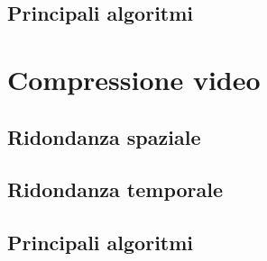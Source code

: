 
\subsection{Principali algoritmi}


\section{Compressione video}


\subsection{Ridondanza spaziale}


\subsection{Ridondanza temporale}


\subsection{Principali algoritmi}

